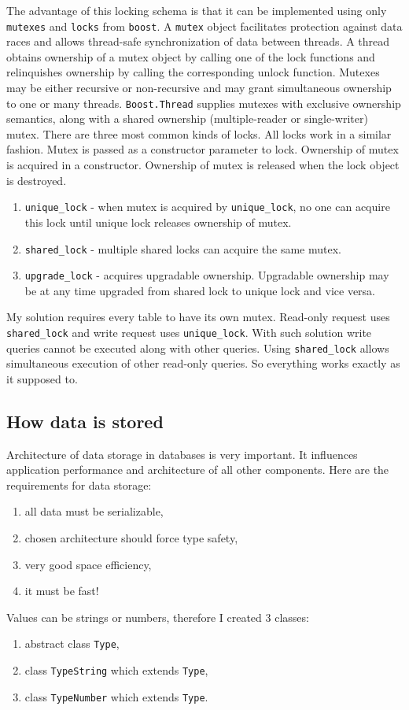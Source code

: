 \documentclass[10pt,a4paper]{article}
\begin{document}
The advantage of this locking schema is that it can be implemented using only \verb|mutexes| and \verb|locks| from \verb|boost|. A \verb|mutex| object facilitates protection against data races and allows thread-safe synchronization of data between threads. A thread obtains ownership of a mutex object by calling one of the lock functions and relinquishes ownership by calling the corresponding unlock function. Mutexes may be either recursive or non-recursive and may grant simultaneous ownership to one or many threads. \verb|Boost.Thread| supplies mutexes with exclusive ownership semantics, along with a shared ownership (multiple-reader or single-writer) mutex.
There are three most common kinds of locks. All locks work in a similar fashion. Mutex is passed as a constructor parameter to lock. Ownership of mutex is acquired in a constructor. Ownership of mutex is released when the lock object is destroyed.  

\begin{enumerate}
\item \verb|unique_lock| - when mutex is acquired by \verb|unique_lock|, no one can acquire this lock until unique lock releases ownership of mutex. 
\item \verb|shared_lock| - multiple shared locks can acquire the same mutex.
\item \verb|upgrade_lock| - acquires upgradable ownership. Upgradable ownership may be at any time upgraded from shared lock to unique lock and vice versa.
\end{enumerate}

My solution requires every table to have its own mutex. Read-only request uses \verb|shared_lock| and write request uses \verb|unique_lock|. With such solution write queries cannot be executed along with other queries. Using \verb|shared_lock| allows simultaneous execution of other read-only queries. So everything works exactly as it supposed to.

\subsection{How data is stored}

Architecture of data storage in databases is very important. It influences application performance and architecture of all other components. Here are the requirements for data storage: 
\begin{enumerate}
\item all data must be serializable,
\item chosen architecture should force type safety,
\item very good space efficiency,
\item it must be fast!
\end{enumerate}
Values can be strings or numbers, therefore I created 3 classes:
\begin{enumerate}
\item abstract class \verb|Type|,
\item class \verb|TypeString| which extends \verb|Type|,
\item class \verb|TypeNumber| which extends \verb|Type|.
\end{enumerate}
\end{document}
